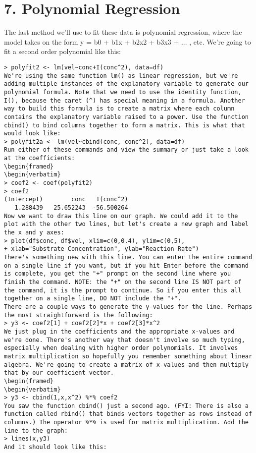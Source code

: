 {%
\section*{7. Polynomial Regression}


The last method we'll use to fit these data is polynomial regression, where the model takes on the form y = b0 + b1x + b2x2 + b3x3 + ... , etc. We're going to fit a second order polynomial like this: 
\begin{framed}
\begin{verbatim}
> polyfit2 <- lm(vel~conc+I(conc^2), data=df)
We're using the same function lm() as linear regression, but we're adding multiple instances of the explanatory variable to generate our polynomial formula. Note that we need to use the identity function, I(), because the caret (^) has special meaning in a formula. Another way to build this formula is to create a matrix where each column contains the explanatory variable raised to a power. Use the function cbind() to bind columns together to form a matrix. This is what that would look like: 
> polyfit2a <- lm(vel~cbind(conc, conc^2), data=df)
Run either of these commands and view the summary or just take a look at the coefficients: 
\begin{framed}
\begin{verbatim}
> coef2 <- coef(polyfit2)
> coef2
(Intercept)        conc   I(conc^2) 
   1.288439   25.652243  -56.500264 
Now we want to draw this line on our graph. We could add it to the plot with the other two lines, but let's create a new graph and label the x and y axes: 
> plot(df$conc, df$vel, xlim=c(0,0.4), ylim=c(0,5), 
+ xlab="Substrate Concentration", ylab="Reaction Rate")
There's something new with this line. You can enter the entire command on a single line if you want, but if you hit Enter before the command is complete, you get the "+" prompt on the second line where you finish the command. NOTE: the "+" on the second line IS NOT part of the command, it is the prompt to continue. So if you enter this all together on a single line, DO NOT include the "+". 
There are a couple ways to generate the y-values for the line. Perhaps the most straightforward is the following: 
> y3 <- coef2[1] + coef2[2]*x + coef2[3]*x^2
We just plug in the coefficients and the appropriate x-values and we're done. There's another way that doesn't involve so much typing, especially when dealing with higher order polynomials. It involves matrix multiplication so hopefully you remember something about linear algebra. We're going to create a matrix of x-values and then multiply that by our coefficient vector. 
\begin{framed}
\begin{verbatim}
> y3 <- cbind(1,x,x^2) %*% coef2
You saw the function cbind() just a second ago. (FYI: There is also a function called rbind() that binds vectors together as rows instead of columns.) The operator %*% is used for matrix multiplication. Add the line to the graph: 
> lines(x,y3)
And it should look like this: 


\end{verbatim}
\end{framed}}
